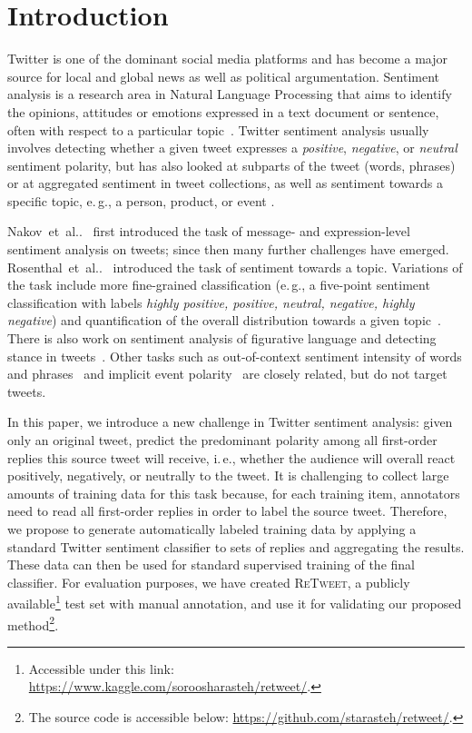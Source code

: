 \documentclass[conference]{IEEEtran}
\makeatletter
\DeclareRobustCommand\onedot{\futurelet\@let@token\@onedot}
\def\@onedot{\ifx\@let@token.\else.\null\fi\xspace}
\newcommand{\etal}[1]{#1~et~al\onedot}
\newcommand{\eg}{e.\,g.,\xspace}
\newcommand{\ie}{i.\,e.,\xspace}
\newcommand{\retweet}{\textsc{ReTweet}\xspace}
\makeatother
\begin{document}
\section{Introduction}

Twitter is one of the dominant social media platforms and has become a major source for local and global news as well as political argumentation. Sentiment analysis is a research area in Natural Language Processing that aims to identify the opinions, attitudes or emotions expressed in a text document or sentence, often with respect to a particular topic~\cite{liu2012sentiment}.
Twitter sentiment analysis usually involves detecting whether a given tweet expresses a \emph{positive}, \emph{negative}, or \emph{neutral} sentiment polarity, but has also looked at subparts of the tweet (words, phrases) or at aggregated sentiment in tweet collections, as well as sentiment towards a specific topic, \eg a person, product, or event \cite{rosenthal-etal-2017-semeval}.

\etal{Nakov}~\cite{nakov-etal-2013-semeval} first introduced the task of message- and expression-level sentiment analysis on tweets;
since then many further challenges have emerged.
\etal{Rosenthal}~\cite{rosenthal2019semeval2015} introduced the task of sentiment towards a topic. Variations of the task include more fine-grained classification (\eg a five-point sentiment classification with labels \emph{highly positive, positive, neutral, negative, highly negative}) and quantification of the overall distribution towards a given topic~\cite{nakov-etal-2016-semeval}. There is also work on
sentiment analysis of figurative language \cite{ghosh-etal-2015-semeval} and detecting stance in tweets~\cite{mohammad-etal-2016-semeval}.
Other tasks such as out-of-context sentiment intensity of words and phrases~\cite{kiritchenko-etal-2016-semeval} and implicit event polarity~\cite{russo-etal-2015-semeval} are closely related, but do not target tweets.

In this paper, we introduce a new challenge in Twitter sentiment analysis: given only an original tweet, predict the predominant polarity among all first-order replies this source tweet will receive, \ie whether the audience will overall react positively, negatively, or neutrally to the tweet. It is challenging to collect large amounts of training data for this task because, for each training item, annotators need to read all first-order replies in order to label the source tweet. 
Therefore, we propose to 
generate automatically labeled training data by applying a standard Twitter sentiment classifier to sets of replies and aggregating the results. These data can then be used for standard supervised training of the final classifier.
For evaluation purposes, we have created \retweet, a publicly available\footnote{Accessible under this link: \url{https://www.kaggle.com/soroosharasteh/retweet/}.}
test set with manual annotation, and use it for validating our proposed method\footnote{The source code is accessible below:
\url{https://github.com/starasteh/retweet/}.}.
\end{document}
